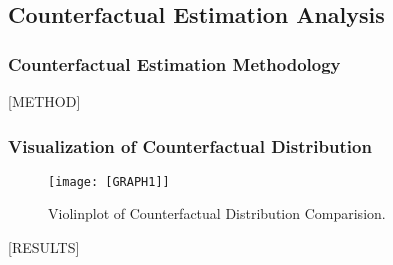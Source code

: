 \subsection{Counterfactual Estimation Analysis}

\subsubsection{Counterfactual Estimation Methodology}

[METHOD]

\subsubsection{Visualization of Counterfactual Distribution}

\begin{figure}[H]
    \centering
    \texttt{[image: [GRAPH1]]}
    \caption{Violinplot of Counterfactual Distribution Comparision.}
\end{figure}

[RESULTS]

